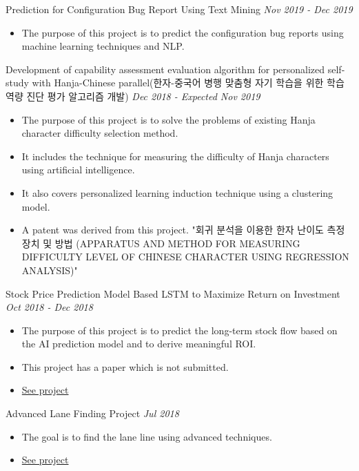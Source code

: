 \documentclass[10pt]{article}
\newenvironment{changemargin}[2]{
  \begin{list}{}{
    \setlength{\topsep}{0pt}
    \setlength{\leftmargin}{#1}
    \setlength{\rightmargin}{#2}
    \setlength{\listparindent}{\parindent}
    \setlength{\itemindent}{\parindent}
    \setlength{\parsep}{\parskip}
  }
  \item[]}{\end{list}
}
\newcommand{\project}[2]{
	{#1} \hfill \emph{#2}\\ \medskip
}
\newenvironment{body} {
	\vspace*{-16pt}
	\begin{changemargin}{-0.25in}{-0.5in}
  }
	{\end{changemargin}
}
\begin{document}
\begin{body}
	\vspace{14pt}
\project{Prediction for Configuration Bug Report Using Text Mining}{Nov 2019 - Dec 2019}
\begin{itemize} \itemsep -0pt  %
      \item  The purpose of this project is to predict the configuration bug reports using machine learning techniques and NLP.
  	\end{itemize}
\project{Development of capability assessment evaluation algorithm for personalized self-study with Hanja-Chinese parallel(한자-중국어 병행 맞춤형 자기 학습을 위한 학습 역량 진단 평가 알고리즘 개발)}{Dec 2018 - Expected Nov 2019}
\begin{itemize} \itemsep -0pt  %
      \item  The purpose of this project is to solve the problems of existing Hanja character difficulty selection method.
      \item It includes the technique for measuring the difficulty of Hanja characters using artificial intelligence.
      \item It also covers personalized learning induction technique using a clustering model.
      \item A patent was derived from this project. "회귀 분석을 이용한 한자 난이도 측정 장치 및 방법
(APPARATUS AND METHOD FOR MEASURING DIFFICULTY LEVEL OF CHINESE CHARACTER USING REGRESSION ANALYSIS)"
  	\end{itemize}
\project{Stock Price Prediction Model Based LSTM to Maximize Return on Investment}{Oct 2018 - Dec 2018}
\begin{itemize} \itemsep -0pt  %
      \item  The purpose of this project is to predict the long-term stock flow based on the AI prediction model and to derive meaningful ROI.
      \item This project has a paper which is not submitted.
      \item \href{https://drive.google.com/file/d/1Fp3WmoBpHpYU13fNWS1vbQSzmBCR3MIu/view}{See project}
  	\end{itemize}
\project{Advanced Lane Finding Project}{Jul 2018}
\begin{itemize} \itemsep -0pt  %
      \item  The goal is to find the lane line using advanced techniques.
      \item \href{https://github.com/jeongwhanchoi/CarND-Advanced-Lane-Lines}{See project}

\end{itemize}
\end{body}
\end{document}
